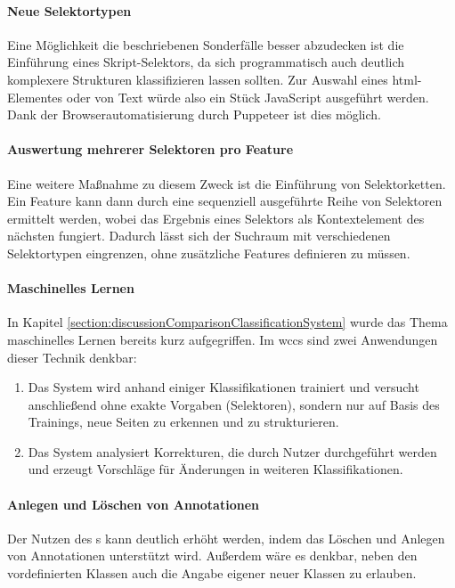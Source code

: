     \paragraph*{Neue Selektortypen}
    Eine Möglichkeit die beschriebenen Sonderfälle besser abzudecken ist die
    Einführung eines Skript-Selektors,
    da sich programmatisch auch deutlich komplexere Strukturen klassifizieren lassen sollten.
    Zur Auswahl eines \gls{html}-Elementes oder von Text würde also ein Stück JavaScript ausgeführt werden.
    Dank der Browserautomatisierung durch Puppeteer ist dies möglich.

    \paragraph*{Auswertung mehrerer Selektoren pro Feature}
    Eine weitere Maßnahme zu diesem Zweck ist die Einführung von Selektorketten.
    Ein Feature kann dann durch eine sequenziell ausgeführte Reihe von Selektoren
    ermittelt werden, wobei das Ergebnis eines Selektors als Kontextelement des nächsten fungiert.
    Dadurch lässt sich der Suchraum mit verschiedenen Selektortypen eingrenzen,
    ohne zusätzliche Features definieren zu müssen.

    \paragraph*{Maschinelles Lernen}
    In Kapitel \ref{section:discussionComparisonClassificationSystem}
    wurde das Thema maschinelles Lernen bereits kurz aufgegriffen.
    Im \gls{wccs} sind zwei Anwendungen dieser Technik denkbar:

    \begin{enumerate}
        \item   Das System wird anhand einiger Klassifikationen trainiert
                und versucht anschließend ohne exakte Vorgaben (Selektoren),
                sondern nur auf Basis des Trainings,
                neue Seiten zu erkennen und zu strukturieren.
        \item   Das System analysiert Korrekturen, die durch Nutzer durchgeführt werden
                und erzeugt Vorschläge für Änderungen in weiteren Klassifikationen.
    \end{enumerate}

    \paragraph*{Anlegen und Löschen von Annotationen}
    Der Nutzen des {\annotatorPlugin}s kann deutlich erhöht werden,
    indem das Löschen und Anlegen von Annotationen unterstützt wird.
    Außerdem wäre es denkbar, neben den vordefinierten Klassen auch
    die Angabe eigener neuer Klassen zu erlauben.
